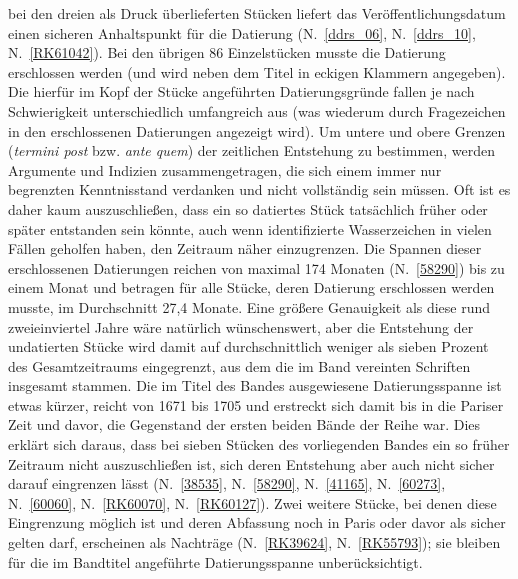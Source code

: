bei den dreien als Druck überlieferten Stücken liefert das Veröffentlichungsdatum einen sicheren Anhaltspunkt für die Datierung (N.~\ref{ddrs_06}, N.~\ref{ddrs_10}, N.~\ref{RK61042}). Bei den übrigen 86 Einzelstücken musste die Datierung erschlossen werden (und wird neben dem Titel in eckigen Klammern angegeben). Die hierfür im Kopf der Stücke angeführten Datierungsgründe fallen je nach Schwierigkeit unterschiedlich umfangreich aus (was wiederum durch Fragezeichen in den erschlossenen Datierungen angezeigt wird). Um untere und obere Grenzen (\textit{termini post} bzw. \textit{ante quem}) der zeitlichen Entstehung zu bestimmen, werden Argumente und Indizien zusammengetragen, die sich einem immer nur begrenzten Kenntnisstand verdanken und nicht vollständig sein müssen. Oft ist es daher kaum auszuschließen, dass ein so datiertes Stück tatsächlich früher oder später entstanden sein könnte, auch wenn identifizierte Wasserzeichen in vielen Fällen geholfen haben, den Zeitraum näher einzugrenzen. Die Spannen dieser erschlossenen Datierungen reichen von maximal 174 Monaten (N.~\ref{58290}) bis zu einem Monat und betragen für alle Stücke, deren Datierung erschlossen werden musste, im Durchschnitt 27,4 Monate. Eine größere Genauigkeit als diese rund zweieinviertel Jahre wäre natürlich wünschenswert, aber die Entstehung der undatierten Stücke wird damit auf durchschnittlich weniger als sieben Prozent des Gesamtzeitraums eingegrenzt, aus dem die im Band vereinten Schriften insgesamt stammen.
Die im Titel des Bandes ausgewiesene Datierungsspanne ist etwas kürzer, reicht von 1671 bis 1705 und erstreckt sich damit bis in die Pariser Zeit und davor, die Gegenstand der ersten beiden Bände der Reihe war. Dies erklärt sich daraus, dass bei sieben Stücken des vorliegenden Bandes ein so früher Zeitraum nicht auszuschließen ist, sich deren Entstehung aber auch nicht sicher darauf eingrenzen lässt (N.~\ref{38535}, N.~\ref{58290}, N.~\ref{41165}, N.~\ref{60273}, N.~\ref{60060}, N.~\ref{RK60070}, N.~\ref{RK60127}). Zwei weitere Stücke, bei denen diese Eingrenzung möglich ist und deren Abfassung noch in Paris oder davor als sicher gelten darf, erscheinen als Nachträge (N.~\ref{RK39624}, N.~\ref{RK55793}); sie bleiben für die im Bandtitel angeführte Datierungsspanne unberücksichtigt. 
\\ \indent
